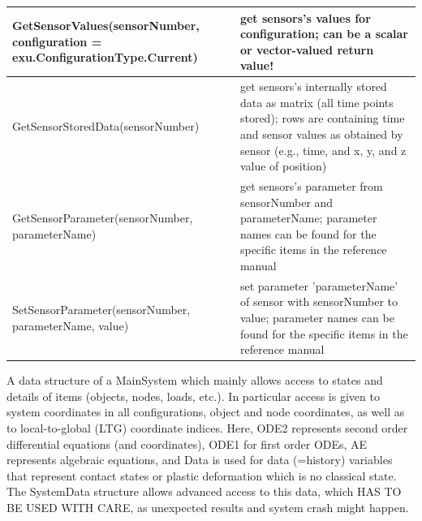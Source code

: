 \begin{center}
\begin{longtable}{| p{8cm} | p{8cm} |}
  GetSensorValues(sensorNumber, configuration = exu.ConfigurationType.Current) & get sensors's values for configuration; can be a scalar or vector-valued return value!\\ \hline 
  GetSensorStoredData(sensorNumber) & get sensors's internally stored data as matrix (all time points stored); rows are containing time and sensor values as obtained by sensor (e.g., time, and x, y, and z value of position)\\ \hline 
  GetSensorParameter(sensorNumber, parameterName) & get sensors's parameter from sensorNumber and parameterName; parameter names can be found for the specific items in the reference manual\\ \hline 
  SetSensorParameter(sensorNumber, parameterName, value) & set parameter 'parameterName' of sensor with sensorNumber to value; parameter names can be found for the specific items in the reference manual\\ \hline 
\end{longtable}
\end{center}

\label{sec:mbs:systemData}
A data structure of a MainSystem which mainly allows access to states and details of items (objects, nodes, loads, etc.). In particular access is given to system coordinates in all configurations, object and node coordinates, as well as to local-to-global (LTG) coordinate indices. Here, ODE2 represents second order differential equations (and coordinates), ODE1 for first order ODEs, AE represents algebraic equations, and Data is used for data (=history) variables that represent contact states or plastic deformation which is no classical state. The SystemData structure allows advanced access to this data, which HAS TO BE USED WITH CARE, as unexpected results and system crash might happen.

